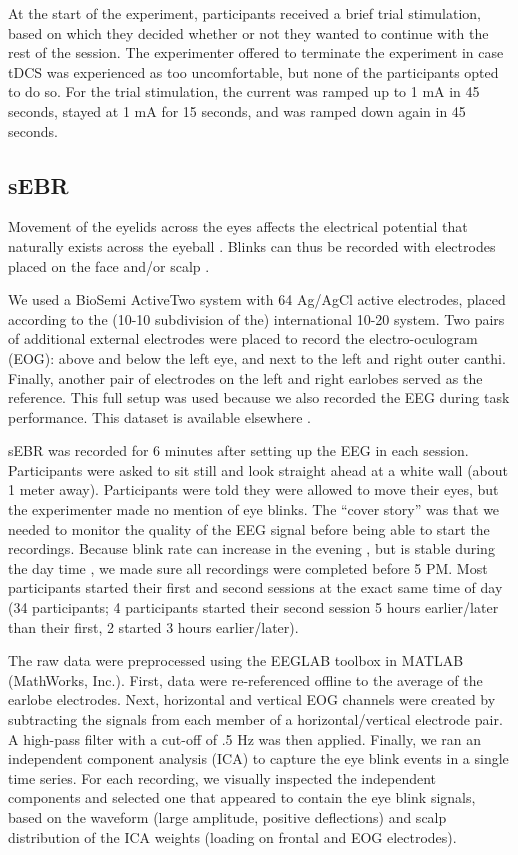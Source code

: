 \documentclass[11pt,]{memoir}
\begin{document}
At the start of the experiment, participants received a brief trial stimulation, based on which they decided whether or not they wanted to continue with the rest of the session. The experimenter offered to terminate the experiment in case tDCS was experienced as too uncomfortable, but none of the participants opted to do so. For the trial stimulation, the current was ramped up to 1 mA in 45 seconds, stayed at 1 mA for 15 seconds, and was ramped down again in 45 seconds.

\hypertarget{AB_sEBR-sEBR}{%
\subsection{sEBR}\label{AB_sEBR-sEBR}}

Movement of the eyelids across the eyes affects the electrical potential that naturally exists across the eyeball \autocite{Matsuo1975}. Blinks can thus be recorded with electrodes placed on the face and/or scalp \autocite{Luck2005}.

We used a BioSemi ActiveTwo system with 64 Ag/AgCl active electrodes, placed according to the (10-10 subdivision of the) international 10-20 system. Two pairs of additional external electrodes were placed to record the electro-oculogram (EOG): above and below the left eye, and next to the left and right outer canthi. Finally, another pair of electrodes on the left and right earlobes served as the reference. This full setup was used because we also recorded the EEG during task performance. This dataset is available elsewhere \autocite{Reteig2019_data}.

sEBR was recorded for 6 minutes after setting up the EEG in each session. Participants were asked to sit still and look straight ahead at a white wall (about 1 meter away). Participants were told they were allowed to move their eyes, but the experimenter made no mention of eye blinks. The ``cover story'' was that we needed to monitor the quality of the EEG signal before being able to start the recordings. Because blink rate can increase in the evening \autocite{Barbato2000}, but is stable during the day time \autocites{Barbato2000}{Doughty2006}, we made sure all recordings were completed before 5 PM. Most participants started their first and second sessions at the exact same time of day (34 participants; 4 participants started their second session 5 hours earlier/later than their first, 2 started 3 hours earlier/later).

The raw data were preprocessed using the EEGLAB toolbox \autocite{Delorme2004} in MATLAB (MathWorks, Inc.). First, data were re-referenced offline to the average of the earlobe electrodes. Next, horizontal and vertical EOG channels were created by subtracting the signals from each member of a horizontal/vertical electrode pair. A high-pass filter with a cut-off of .5 Hz was then applied. Finally, we ran an independent component analysis (ICA) to capture the eye blink events in a single time series. For each recording, we visually inspected the independent components and selected one that appeared to contain the eye blink signals, based on the waveform (large amplitude, positive deflections) and scalp distribution of the ICA weights (loading on frontal and EOG electrodes).
\end{document}
